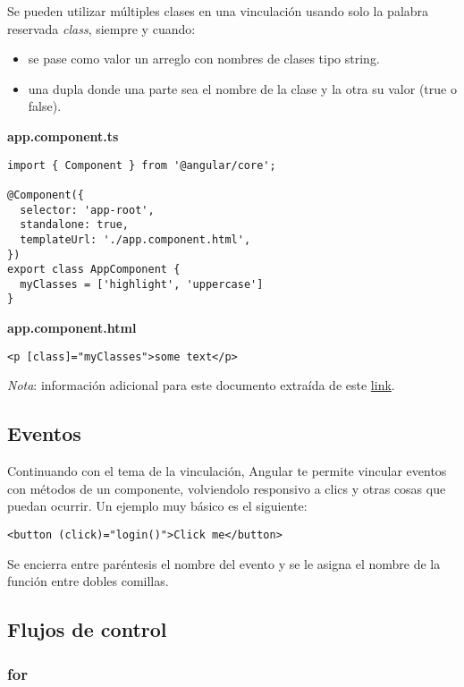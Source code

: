 Se pueden utilizar múltiples clases en una vinculación usando solo la palabra reservada \textit{class}, siempre y cuando:
\begin{itemize}
    \item se pase como valor un arreglo con nombres de clases tipo string.
    \item una dupla donde una parte sea el nombre de la clase y la otra su valor (true o false).
\end{itemize}

\textbf{app.component.ts}
\begin{lstlisting}[style=htmlcssjs]
import { Component } from '@angular/core';

@Component({
  selector: 'app-root',
  standalone: true,
  templateUrl: './app.component.html',
})
export class AppComponent {
  myClasses = ['highlight', 'uppercase']
}
\end{lstlisting}

\textbf{app.component.html}
\begin{lstlisting}[style=htmlcssjs]
<p [class]="myClasses">some text</p>
\end{lstlisting}

\textit{Nota}: información adicional para este documento extraída de este \href{https://angular.io/guide/class-binding}{link}.


\subsection{Eventos}

Continuando con el tema de la vinculación, Angular te permite vincular eventos con métodos de un componente, volviendolo responsivo a clics y otras cosas que puedan ocurrir. Un ejemplo muy básico es el siguiente:
\begin{lstlisting}[style=htmlcssjs]
<button (click)="login()">Click me</button>
\end{lstlisting}

Se encierra entre paréntesis el nombre del evento y se le asigna el nombre de la función entre dobles comillas.


\subsection{Flujos de control}

\subsubsection{for}

